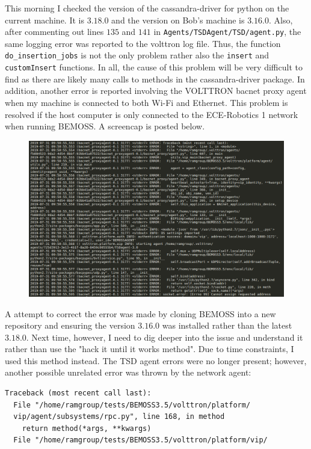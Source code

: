 \documentclass[fontsize=11pt, %
                             paper=letter, %
                             twoside, %
                             captions=tableheading,
                             index=totoc,
                             hyperref]{labbook}
\begin{document}
\begin{addmargin}[0cm]{0cm}
This morning I checked the version of the cassandra-driver for python on the current machine. It is $3.18.0$ and the version on Bob's machine is $3.16.0.$ Also, after commenting out lines $135$ and $141$ in \texttt{Agents/TSDAgent/TSD/agent.py}, the same logging error was reported to the volttron log file. Thus, the function \texttt{do\_insertion\_jobs} is not the only problem rather also the \texttt{insert} and \texttt{customInsert} functions. In all, the cause of this problem will be very difficult to find as there are likely many calls to methods in the cassandra-driver package. In addition, another error is reported involving the VOLTTRON bacnet proxy agent when my machine is connected to both Wi-Fi and Ethernet. This problem is resolved if the host computer is only connected to the ECE-Robotics 1 network when running BEMOSS. A screencap is posted below.
\begin{figure}[h]
\center
\includegraphics[scale=0.3]{figs/bacnetAgentError.png}
\end{figure}
A attempt to correct the error was made by cloning BEMOSS into a new repository and ensuring the version $3.16.0$ was installed rather than the latest $3.18.0$. Next time, however, I need to dig deeper into the issue and understand it rather than use the "hack it until it works method". Due to time constraints, I used this method instead. The TSD agent errors were no longer present; however, another possible unrelated error was thrown by the network agent:
\begin{Verbatim}[tabsize=4]
Traceback (most recent call last):
  File "/home/ramgroup/tests/BEMOSS3.5/volttron/platform/
  vip/agent/subsystems/rpc.py", line 168, in method
    return method(*args, **kwargs)
  File "/home/ramgroup/tests/BEMOSS3.5/volttron/platform/vip/

\end{Verbatim}
\end{addmargin}
\end{document}
